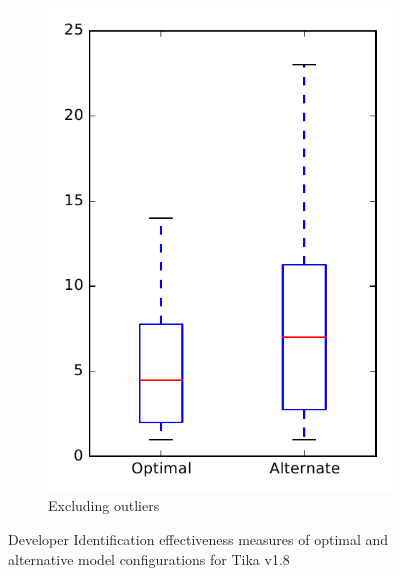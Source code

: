 \begin{figure}
\begin{subfigure}{.4\textwidth}
        \includegraphics[height=0.4\textheight]{figures/combo/dit_rq1_tika_no_outlier}
        \caption{Excluding outliers}\label{fig:combo:dit:rq1:tika_no_outlier}
    \end{subfigure}
\caption{Developer Identification effectiveness measures of optimal and alternative model configurations for Tika v1.8}
\label{fig:combo:dit:rq1:tika}
\end{figure}
